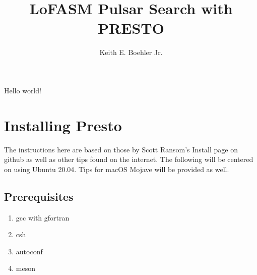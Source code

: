 \documentclass{article}
\title{LoFASM Pulsar Search with PRESTO}
\author{Keith E. Boehler Jr.}
\date{}
\begin{document}
   \maketitle
   Hello world!
   
   \section{Installing Presto}
   The instructions here are based on those by Scott Ransom's Install page on github as well as other 
   tips found on the internet. The following will be centered on using Ubuntu 20.04. Tips for macOS Mojave
   will be provided as well. 
   \subsection{Prerequisites}
   \begin{enumerate}
   	\item gcc with gfortran
   	\item csh
   	\item autoconf
   	\item meson
   \end{enumerate}
   
\end{document}
